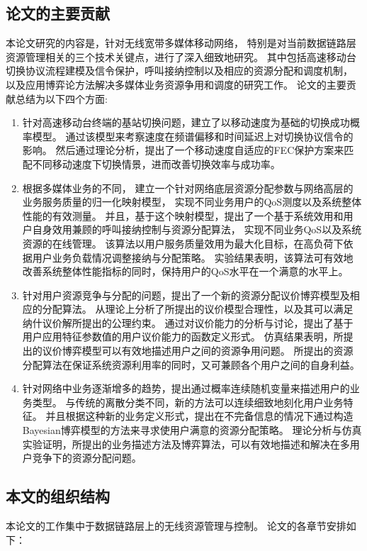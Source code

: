 \subsection{论文的主要贡献}
本论文研究的内容是，针对无线宽带多媒体移动网络，
特别是对当前数据链路层资源管理相关的三个技术关键点，进行了深入细致地研究。
其中包括高速移动台切换协议流程建模及信令保护，呼叫接纳控制以及相应的资源分配和调度机制，
以及应用博弈论方法解决多媒体业务资源争用和调度的研究工作。
论文的主要贡献总结为以下四个方面:
\begin{enumerate}[(1.)]
\item 
针对高速移动台终端的基站切换问题，建立了以移动速度为基础的切换成功概率模型。
通过该模型来考察速度在频谱偏移和时间延迟上对切换协议信令的影响。
然后通过理论分析，提出了一个移动速度自适应的FEC保护方案来匹配不同移动速度下切换情景，进而改善切换效率与成功率。

\item 
根据多媒体业务的不同，
建立一个针对网络底层资源分配参数与网络高层的业务服务质量的归一化映射模型，
实现不同业务用户的QoS测度以及系统整体性能的有效测量。
并且，基于这个映射模型，提出了一个基于系统效用和用户自身效用兼顾的呼叫接纳控制与资源分配算法，
实现不同业务QoS以及系统资源的在线管理。
该算法以用户服务质量效用为最大化目标，在高负荷下依据用户业务负载情况调整接纳与分配策略。
实验结果表明，该算法可有效地改善系统整体性能指标的同时，保持用户的QoS水平在一个满意的水平上。

\item 
针对用户资源竞争与分配的问题，提出了一个新的资源分配议价博弈模型及相应的分配算法。
从理论上分析了所提出的议价模型合理性，以及其可以满足纳什议价解所提出的公理约束。
通过对议价能力的分析与讨论，提出了基于用户应用特征参数值的用户议价能力的函数定义形式。
仿真结果表明，所提出的议价博弈模型可以有效地描述用户之间的资源争用问题。
所提出的资源分配算法在保证系统资源利用率的同时，又可兼顾各个用户之间的自身利益。

\item 
针对网络中业务逐渐增多的趋势，提出通过概率连续随机变量来描述用户的业务类型。
与传统的离散分类不同，新的方法可以连续细致地刻化用户业务特征。
并且根据这种新的业务定义形式，提出在不完备信息的情况下通过构造Bayesian博弈模型的方法来寻求使用户满意的资源分配策略。
理论分析与仿真实验证明，所提出的业务描述方法及博弈算法，可以有效地描述和解决在多用户竞争下的资源分配问题。
\end{enumerate}

\subsection{本文的组织结构}
本论文的工作集中于数据链路层上的无线资源管理与控制。
论文的各章节安排如下：

